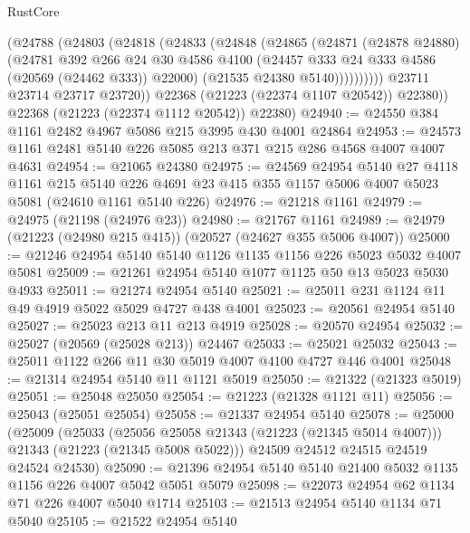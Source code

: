 \begin{lexlean}{RustCore}
\begin{coremodule}
                (@24788
                  (@24803
                    (@24818
                      (@24833
                        (@24848
                          (@24865
                            (@24871
                              (@24878 @24880)
                              (@24781
                                @392
                                @266
                                @24
                                @30
                                @4586
                                @4100
                                (@24457 @333 @24 @333 @4586 (@20569 (@24462 @333)) @22000)
                                (@21535 @24380 @5140))))))))))
              @23711
              @23714
              @23717
              @23720))
          @22368
          (@21223 (@22374 @1107 @20542))
          @22380))
      @22368
      (@21223 (@22374 @1112 @20542))
      @22380)
@24940 := @24550 @384 @1161 @2482 @4967 @5086 @215 @3995 @430 @4001 @24864
@24953 := @24573 @1161 @2481 @5140 @226 @5085 @213 @371 @215 @286 @4568 @4007 @4007 @4631
@24954 := @21065 @24380
@24975 := @24569
    @24954
    @5140
    @27
    @4118
    @1161
    @215
    @5140
    @226
    @4691
    @23
    @415
    @355
    @1157
    @5006
    @4007
    @5023
    @5081
    (@24610 @1161 @5140 @226)
@24976 := @21218 @1161
@24979 := @24975 (@21198 (@24976 @23))
@24980 := @21767 @1161
@24989 := @24979 (@21223 (@24980 @215 @415)) (@20527 (@24627 @355 @5006 @4007))
@25000 := @21246 @24954 @5140 @5140 @1126 @1135 @1156 @226 @5023 @5032 @4007 @5081
@25009 := @21261 @24954 @5140 @1077 @1125 @50 @13 @5023 @5030 @4933
@25011 := @21274 @24954 @5140
@25021 := @25011 @231 @1124 @11 @49 @4919 @5022 @5029 @4727 @438 @4001
@25023 := @20561 @24954 @5140
@25027 := @25023 @213 @11 @213 @4919
@25028 := @20570 @24954
@25032 := @25027 (@20569 (@25028 @213)) @24467
@25033 := @25021 @25032
@25043 := @25011 @1122 @266 @11 @30 @5019 @4007 @4100 @4727 @446 @4001
@25048 := @21314 @24954 @5140 @11 @1121 @5019
@25050 := @21322 (@21323 @5019)
@25051 := @25048 @25050
@25054 := @21223 (@21328 @1121 @11)
@25056 := @25043 (@25051 @25054)
@25058 := @21337 @24954 @5140
@25078 := @25000
    (@25009
      (@25033
        (@25056 @25058 @21343 (@21223 (@21345 @5014 @4007)))
        @21343
        (@21223 (@21345 @5008 @5022)))
      @24509
      @24512
      @24515
      @24519
      @24524
      @24530)
@25090 := @21396 @24954 @5140 @5140 @21400 @5032 @1135 @1156 @226 @4007 @5042 @5051 @5079
@25098 := @22073 @24954 @62 @1134 @71 @226 @4007 @5040 @1714
@25103 := @21513 @24954 @5140 @1134 @71 @5040
@25105 := @21522 @24954 @5140

\end{coremodule}
\end{lexlean}
